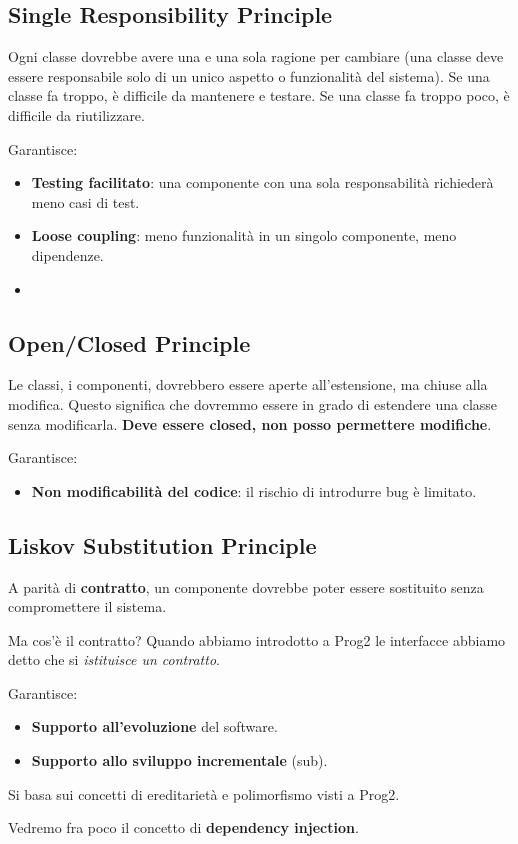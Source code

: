 \subsection{Single Responsibility Principle}
\par Ogni classe dovrebbe avere una e una sola ragione per cambiare (una classe deve essere responsabile solo di un unico aspetto o funzionalità del sistema). Se una classe fa troppo, è difficile da mantenere e testare. Se una classe fa troppo poco, è difficile da riutilizzare.
\par Garantisce:
\begin{itemize}
    \item \textbf{Testing facilitato}: una componente con una sola responsabilità richiederà meno casi di test.
    \item \textbf{Loose coupling}: meno funzionalità in un singolo componente, meno dipendenze.
    \item 
\end{itemize}

\subsection{Open/Closed Principle}
\par Le classi, i componenti, dovrebbero essere aperte all'estensione, ma chiuse alla modifica. Questo significa che dovremmo essere in grado di estendere una classe senza modificarla. \textbf{Deve essere closed, non posso permettere modifiche}.
\par Garantisce:
\begin{itemize}
    \item \textbf{Non modificabilità del codice}: il rischio di introdurre bug è limitato.
\end{itemize}

\subsection{Liskov Substitution Principle}
\par A parità di \textbf{contratto}, un componente dovrebbe poter essere sostituito senza compromettere il sistema.
\par Ma cos'è il contratto? Quando abbiamo introdotto a Prog2 le interfacce abbiamo detto che si \textit{istituisce un contratto}.
\par Garantisce:
\begin{itemize}
    \item \textbf{Supporto all'evoluzione} del software.
    \item \textbf{Supporto allo sviluppo incrementale} (sub).
\end{itemize}
\par Si basa sui concetti di ereditarietà e polimorfismo visti a Prog2.
\par Vedremo fra poco il concetto di \textbf{dependency injection}.

